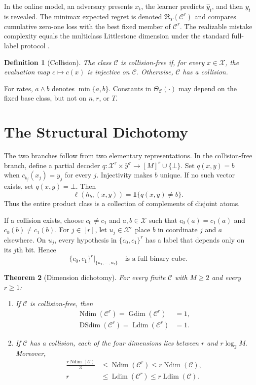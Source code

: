 \documentclass[twoside]{article}
\newtheorem{theorem}{Theorem}
\newtheorem{definition}[theorem]{Definition}
\newcommand{\C}{\mathcal C}
\newcommand{\Ldim}{\operatorname{Ldim}}
\newcommand{\Ndim}{\operatorname{Ndim}}
\newcommand{\Gdim}{\operatorname{Gdim}}
\newcommand{\DSdim}{\operatorname{DSdim}}
\newcommand{\Risk}{\mathfrak R}
\begin{document}
In the online model, an adversary presents $x_t$, the learner predicts $\widehat y_t$, and then $y_t$ is revealed. The minimax expected regret is denoted $\Risk_T(\C^r)$ and compares cumulative zero-one loss with the best fixed member of $\C^r$. The realizable mistake complexity equals the multiclass Littlestone dimension under the standard full-label protocol \citep{daniely2015}.

\begin{definition}[Collision]
The class $\C$ is collision-free if, for every $x\in\mathcal X$, the evaluation map $c\mapsto c(x)$ is injective on $\C$. Otherwise, $\C$ has a collision.
\end{definition}

For rates, $a\wedge b$ denotes $\min\{a,b\}$. Constants in $\Theta_{\C}(\cdot)$ may depend on the fixed base class, but not on $n,r$, or $T$.

\section{The Structural Dichotomy}
\label{sec:structure}

The two branches follow from two elementary representations. In the collision-free branch, define a partial decoder $q:\mathcal X^r\times\mathcal Y^r\to[M]^r\cup\{\bot\}$. Set $q(x,y)=b$ when $c_{b_j}(x_j)=y_j$ for every $j$. Injectivity makes $b$ unique. If no such vector exists, set $q(x,y)=\bot$. Then
\begin{equation}
 \ell(h_b,(x,y))=\mathbf1\{q(x,y)\neq b\}.
 \label{eq:decoder-loss}
\end{equation}
Thus the entire product class is a collection of complements of disjoint atoms.

If a collision exists, choose $c_0\neq c_1$ and $a,b\in\mathcal X$ such that $c_0(a)=c_1(a)$ and $c_0(b)\neq c_1(b)$. For $j\in[r]$, let $u_j\in\mathcal X^r$ place $b$ in coordinate $j$ and $a$ elsewhere. On $u_j$, every hypothesis in $\{c_0,c_1\}^r$ has a label that depends only on its $j$th bit. Hence
\begin{equation}
 \{c_0,c_1\}^r\big|_{\{u_1,\ldots,u_r\}}
 \quad\text{is a full binary cube.}
 \label{eq:collision-cube}
\end{equation}

\begin{theorem}[Dimension dichotomy]
\label{thm:dimensions}
For every finite $\C$ with $M\geq2$ and every $r\geq1$:
\begin{enumerate}
\item If $\C$ is collision-free, then
\begin{align*}
 \Ndim(\C^r)=\Gdim(\C^r)&=1,\\
 \DSdim(\C^r)=\Ldim(\C^r)&=1.
\end{align*}
\item If $\C$ has a collision, each of the four dimensions lies between $r$ and $r\log_2M$. Moreover,
\begin{align*}
 \frac{r\Ndim(\C)}{3}
 &\leq\Ndim(\C^r)\leq r\Ndim(\C),\\
 r&\leq\Ldim(\C^r)\leq r\Ldim(\C).
\end{align*}
\end{enumerate}
\end{theorem}
\end{document}
